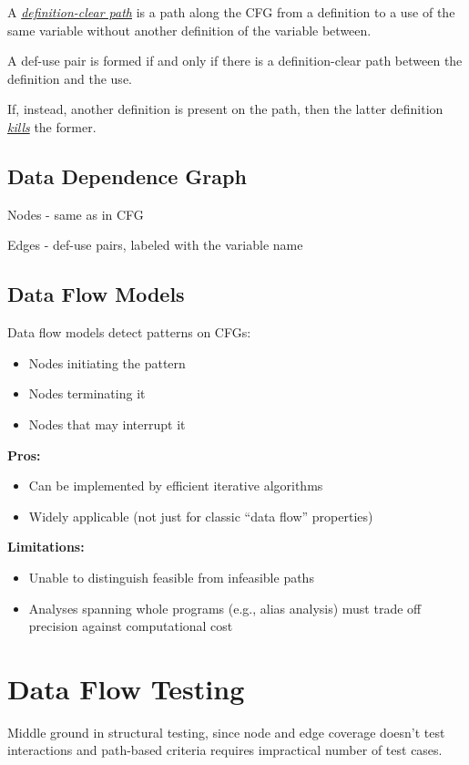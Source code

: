 \documentclass{article}
\begin{document}
A \textit{\underline{definition-clear path}} is a path along the CFG from a definition to a use of the same variable without another definition of the variable between.

A def-use pair is formed if and only if there is a
definition-clear path between the definition
and the use.

If, instead, another definition is present on the path, then the latter definition \textit{\underline{kills}} the former.

\subsection{Data Dependence Graph}

Nodes - same as in CFG

Edges - def-use pairs, labeled with the variable name

\subsection{Data Flow Models}
Data flow models detect patterns on CFGs:
\begin{itemize}
  \item Nodes initiating the pattern
  \item Nodes terminating it
  \item Nodes that may interrupt it
\end{itemize}

\textbf{Pros:}
\begin{itemize}
  \item Can be implemented by efficient iterative algorithms
  \item  Widely applicable (not just for classic “data flow” properties)
\end{itemize}

\textbf{Limitations:}
\begin{itemize}
  \item Unable to distinguish feasible from infeasible paths
  \item Analyses spanning whole programs (e.g., alias analysis) must trade off precision against computational cost
\end{itemize}

\section{Data Flow Testing}

Middle ground in structural testing, since node and edge coverage doesn't test interactions and path-based criteria requires impractical number of test cases.
\end{document}
